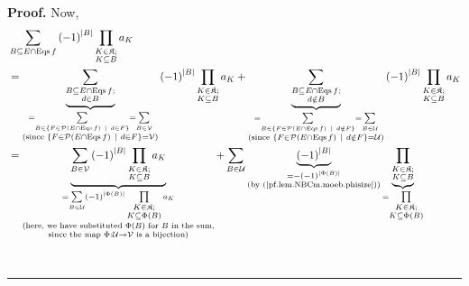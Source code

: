 \documentclass[numbers=enddot,12pt,final,onecolumn,notitlepage]{scrartcl}%
\theoremstyle{definition}
\newenvironment{proof}[1][Proof]{\noindent\textbf{#1.} }{\ \rule{0.5em}{0.5em}}
\newenvironment{verlong}{}{}
\let\sumnonlimits\sum
\let\prodnonlimits\prod
\renewcommand{\sum}{\sumnonlimits\limits}
\renewcommand{\prod}{\prodnonlimits\limits}
\begin{document}
\begin{verlong}
\begin{proof}
Now,%
\begin{align*}
&  \sum_{B\subseteq E\cap\operatorname*{Eqs}f}\left(  -1\right)  ^{\left\vert
B\right\vert }\prod_{\substack{K\in\mathfrak{K};\\K\subseteq B}}a_{K}\\
&  =\underbrace{\sum_{\substack{B\subseteq E\cap\operatorname*{Eqs}f;\\d\in
B}}}_{\substack{=\sum_{B\in\left\{  F\in\mathcal{P}\left(  E\cap
\operatorname*{Eqs}f\right)  \ \mid\ d\in F\right\}  }=\sum_{B\in\mathcal{V}%
}\\\text{(since }\left\{  F\in\mathcal{P}\left(  E\cap\operatorname*{Eqs}%
f\right)  \ \mid\ d\in F\right\}  =\mathcal{V}\text{)}}}\left(  -1\right)
^{\left\vert B\right\vert }\prod_{\substack{K\in\mathfrak{K};\\K\subseteq
B}}a_{K}+\underbrace{\sum_{\substack{B\subseteq E\cap\operatorname*{Eqs}%
f;\\d\notin B}}}_{\substack{=\sum_{B\in\left\{  F\in\mathcal{P}\left(
E\cap\operatorname*{Eqs}f\right)  \ \mid\ d\notin F\right\}  }=\sum
_{B\in\mathcal{U}}\\\text{(since }\left\{  F\in\mathcal{P}\left(
E\cap\operatorname*{Eqs}f\right)  \ \mid\ d\notin F\right\}  =\mathcal{U}%
\text{)}}}\left(  -1\right)  ^{\left\vert B\right\vert }\prod_{\substack{K\in
\mathfrak{K};\\K\subseteq B}}a_{K}\\
&  =\underbrace{\sum_{B\in\mathcal{V}}\left(  -1\right)  ^{\left\vert
B\right\vert }\prod_{\substack{K\in\mathfrak{K};\\K\subseteq B}}a_{K}%
}_{\substack{=\sum_{B\in\mathcal{U}}\left(  -1\right)  ^{\left\vert
\Phi\left(  B\right)  \right\vert }\prod_{\substack{K\in\mathfrak{K}%
;\\K\subseteq\Phi\left(  B\right)  }}a_{K}\\\text{(here, we have substituted
}\Phi\left(  B\right)  \text{ for }B\text{ in the sum,}\\\text{since the map
}\Phi:\mathcal{U}\rightarrow\mathcal{V}\text{ is a bijection)}}}+\sum
_{B\in\mathcal{U}}\underbrace{\left(  -1\right)  ^{\left\vert B\right\vert }%
}_{\substack{=-\left(  -1\right)  ^{\left\vert \Phi\left(  B\right)
\right\vert }\\\text{(by (\ref{pf.lem.NBCm.moeb.phisize}))}}}\underbrace{\prod
_{\substack{K\in\mathfrak{K};\\K\subseteq B}}}_{\substack{=\prod
_{\substack{K\in\mathfrak{K};\\K\subseteq\Phi\left(  B\right)  }%
}}}
\end{align*}
\end{proof}
\end{verlong}
\end{document}
